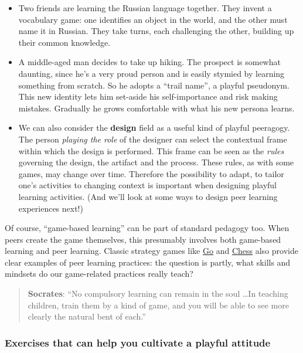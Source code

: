 \begin{itemize}
\tightlist
\item
  Two friends are learning the Russian language together. They invent a
  vocabulary game: one identifies an object in the world, and the other
  must name it in Russian. They take turns, each challenging the other,
  building up their common knowledge.
\item
  A middle-aged man decides to take up hiking. The prospect is somewhat
  daunting, since he's a very proud person and is easily stymied by
  learning something from scratch. So he adopts a ``trail name'', a
  playful pseudonym. This new identity lets him set-aside his
  self-importance and risk making mistakes. Gradually he grows
  comfortable with what his new persona learns.
\item
  We can also consider the \textbf{design} field as a useful kind of
  playful peeragogy. The person \emph{playing the role} of the designer
  can select the contextual frame within which the design is performed.
  This frame can be seen as the \emph{rules} governing the design, the
  artifact and the process. These rules, as with some games, may change
  over time. Therefore the possibility to adapt, to tailor one's
  activities to changing context is important when designing playful
  learning activities. (And we'll look at some ways to design peer
  learning experiences next!)
\end{itemize}

Of course, ``game-based learning'' can be part of standard pedagogy too.
When peers create the game themselves, this presumably involves both
game-based learning and peer learning. Classic strategy games like
\href{http://senseis.xmp.net/?MythOfOrigin}{Go} and
\href{http://www.amazon.com/Chess-Success-Using-Strengths-Children/dp/0767915682}{Chess}
also provide clear examples of peer learning practices: the question is
partly, what skills and mindsets do our game-related practices really
teach?

\begin{quote}
\textbf{Socrates}: ``No compulsory learning can remain in the soul
\ldots In teaching children, train them by a kind of game, and you will
be able to see more clearly the natural bent of each.''
\end{quote}

\hypertarget{exercises-that-can-help-you-cultivate-a-playful-attitude}{%
\subsubsection{Exercises that can help you cultivate a playful
attitude}\label{exercises-that-can-help-you-cultivate-a-playful-attitude}}

